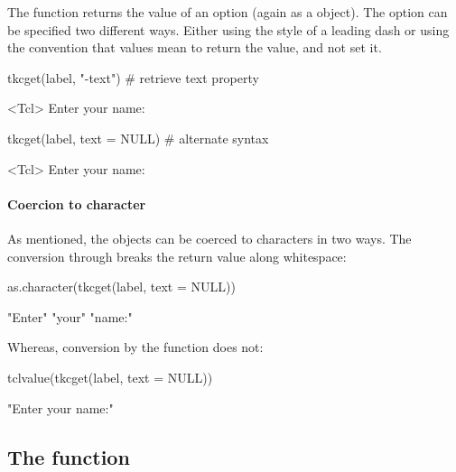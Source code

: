 The  function returns the value of an
option (again as a  object). The option can be specified
two different ways. Either using the \TK\/ style of a leading dash or
using the \R{} convention that  values mean to return the value,
and not set it.


\begin{Schunk}
\begin{Sinput}
 tkcget(label, "-text")               # retrieve text property
\end{Sinput}
\begin{Soutput}
<Tcl> Enter your name: 
\end{Soutput}
\begin{Sinput}
 tkcget(label, text = NULL)           # alternate syntax
\end{Sinput}
\begin{Soutput}
<Tcl> Enter your name: 
\end{Soutput}
\end{Schunk}

\paragraph{Coercion to character}
As mentioned, the  objects can be coerced to characters in two ways.
The conversion through  breaks the return value along whitespace:
\begin{Schunk}
\begin{Sinput}
 as.character(tkcget(label, text = NULL))
\end{Sinput}
\begin{Soutput}
[1] "Enter" "your"  "name:"
\end{Soutput}
\end{Schunk}
%
Whereas, conversion by the  function does not:
\begin{Schunk}
\begin{Sinput}
 tclvalue(tkcget(label, text = NULL))
\end{Sinput}
\begin{Soutput}
[1] "Enter your name:"
\end{Soutput}
\end{Schunk}
%

\subsection{The  function}
\label{sec:codetkw-funct}



